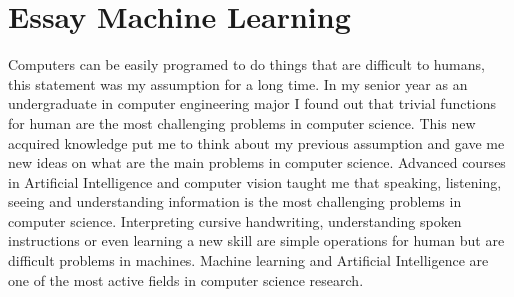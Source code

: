 \documentclass[a4paper,12pt]{article}%
\begin{document}
\section{Essay Machine Learning}
 
 Computers can be easily programed to do things that are difficult to humans, this statement was my assumption for a long time. In my senior year as an undergraduate in computer engineering major I found out that trivial functions for human are the most challenging problems in computer science. This new acquired knowledge put me to think about my previous assumption and gave me new ideas on what are the main problems in computer science. Advanced courses in Artificial Intelligence and computer vision taught me that speaking, listening, seeing and understanding information is the most challenging problems in computer science. Interpreting cursive handwriting,  understanding spoken instructions or even learning a new skill are simple operations for human but are difficult problems in machines. Machine learning and Artificial Intelligence are one of the most active fields in computer science research.
  
\end{document}

